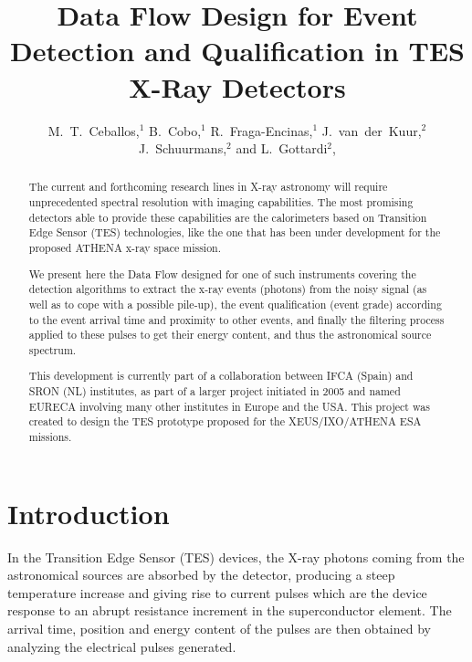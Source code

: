 
\resetcounters




\title{Data Flow Design for Event Detection and Qualification 
in TES X-Ray Detectors}
\author{M.~T.~Ceballos,$^1$ B.~Cobo,$^1$ R.~Fraga-Encinas,$^1$ J.~van~der~Kuur,$^2$ J.~Schuurmans,$^2$ and L.~Gottardi$^2$,
}


\begin{abstract}
The current and forthcoming research lines in X-ray astronomy will require unprecedented 
spectral resolution with imaging capabilities. The most promising detectors able to provide 
these capabilities are the calorimeters based on Transition Edge Sensor (TES) technologies, like 
the one that has been under development for the proposed ATHENA x-ray space mission.

We present here the Data Flow designed for one of such instruments covering the 
detection algorithms to extract the x-ray events (photons) from the noisy signal (as well as to cope with 
a possible pile-up), the event qualification (event grade) according to the event arrival time
 and proximity to other events, and finally the filtering process applied to these pulses to 
get their energy content, and thus the astronomical source spectrum.

This development is currently part of a collaboration between
IFCA (Spain) and SRON (NL) institutes, as part of a larger project initiated in 2005 and 
named EURECA \citep{deKorte_2009} involving many other institutes in Europe and the USA. This project was created to
design the TES prototype proposed for the XEUS/IXO/ATHENA ESA missions.
\end{abstract}

\section{Introduction}

In the Transition Edge Sensor (TES) devices, the X-ray photons coming from the astronomical sources 
are absorbed by the detector, producing a steep temperature increase and giving rise to current
pulses which are the device response to an abrupt resistance increment in the superconductor element. 
The arrival time, position and energy content of the pulses are then obtained by
analyzing the electrical pulses generated.

